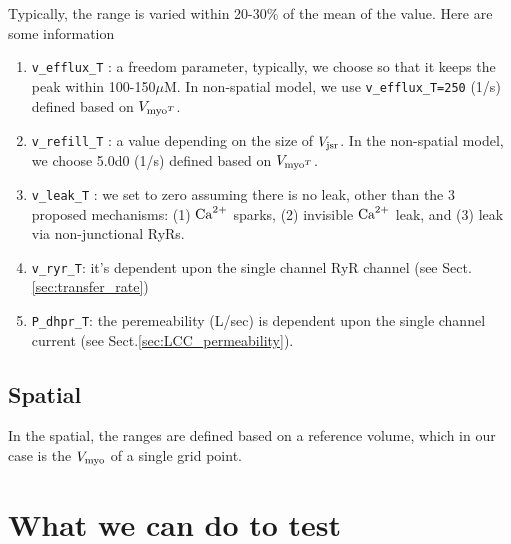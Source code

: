 Typically, the range is varied within 20-30\% of the mean of the value. Here are
some information 
\begin{enumerate}
  \item \verb!v_efflux_T! : a freedom parameter, typically, we choose so
  that it keeps the peak within 100-150$\mu$M. In non-spatial model, we use
  \verb!v_efflux_T=250! (1/s) defined based on $V_{\text{myo}^T}$.
  
  \item \verb!v_refill_T! : a value depending on the size of $V_{\text{jsr}}$.
  In the non-spatial model, we choose 5.0d0 (1/s) defined based on $V_{\text{myo}^T}$.
  
  \item \verb!v_leak_T! : we set to zero assuming there is no leak, other than
  the 3 proposed mechanisms: (1) ${\text{Ca}^{2+}}$ sparks, (2) invisible ${\text{Ca}^{2+}}$ leak, and
  (3) leak via non-junctional RyRs.
  
  \item \verb!v_ryr_T!: it's dependent upon the single channel RyR channel (see
  Sect.\ref{sec:transfer_rate})
  
  \item \verb!P_dhpr_T!: the peremeability (L/sec) is dependent upon the single
  channel current (see Sect.\ref{sec:LCC_permeability}).
\end{enumerate}

\subsection{Spatial}
\label{sec:ranges_spatial}

In the spatial, the ranges are defined based on a reference volume, which in our
case is the $V_{\text{myo}}$ of a single grid point.

\section{What we can do to test}
\label{sec:what-we-can}

